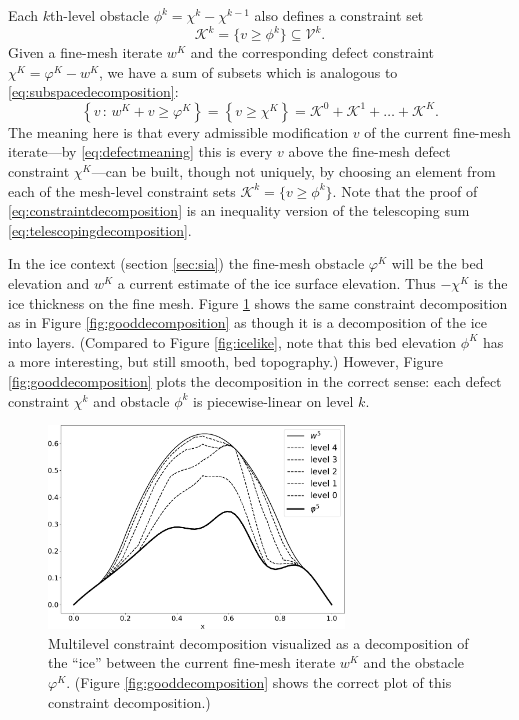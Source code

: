 \documentclass[letterpaper,final,12pt,reqno]{amsart}
\numberwithin{equation}{section}
\numberwithin{figure}{section}
\numberwithin{table}{section}
\begin{document}
Each $k$th-level obstacle $\phi^k = \chi^k - \chi^{k-1}$ also defines a constraint set
\begin{equation}
  \mathcal{K}^k = \{v \ge \phi^k\} \subseteq \mathcal{V}^k.  \label{eq:levelconstraint}
\end{equation}
Given a fine-mesh iterate $w^K$ and the corresponding defect constraint $\chi^K = \varphi^K - w^K$, we have a sum of subsets which is analogous to \eqref{eq:subspacedecomposition}:
\begin{equation}
  \left\{v\,:\,w^K + v \ge \varphi^K\right\} = \left\{v \ge \chi^K\right\} = \mathcal{K}^0 + \mathcal{K}^1 + \dots + \mathcal{K}^K. \label{eq:constraintdecomposition}
\end{equation}
The meaning here is that every admissible modification $v$ of the current fine-mesh iterate---by \eqref{eq:defectmeaning} this is every $v$ above the fine-mesh defect constraint $\chi^K$---can be built, though not uniquely, by choosing an element from each of the mesh-level constraint sets $\mathcal{K}^k = \{v \ge \phi^k\}$.  Note that the proof of \eqref{eq:constraintdecomposition} is an inequality version of the telescoping sum \eqref{eq:telescopingdecomposition}.

In the ice context (section \ref{sec:sia}) the fine-mesh obstacle $\varphi^K$ will be the bed elevation and $w^K$ a current estimate of the ice surface elevation.  Thus $-\chi^K$ is the ice thickness on the fine mesh.  Figure \ref{fig:icelikedecomposition} shows the same constraint decomposition as in Figure \ref{fig:gooddecomposition} as though it is a decomposition of the ice into layers.  (Compared to Figure \ref{fig:icelike}, note that this bed elevation $\phi^K$ has a more interesting, but still smooth, bed topography.)  However, Figure \ref{fig:gooddecomposition} plots the decomposition in the correct sense: each defect constraint $\chi^k$ and obstacle $\phi^k$ is piecewise-linear on level $k$.

\begin{figure}
\includegraphics[width=0.7\textwidth]{fixfigs/icedec_defect.pdf}
\caption{Multilevel constraint decomposition visualized as a decomposition of the ``ice'' between the current fine-mesh iterate $w^K$ and the obstacle $\varphi^K$.  (Figure \ref{fig:gooddecomposition} shows the correct plot of this constraint decomposition.)}
\label{fig:icelikedecomposition}
\end{figure}
\end{document}
